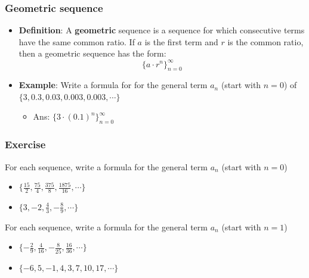 \documentclass[t]{beamer}
\theoremstyle{plain}
\theoremstyle{definition}
\begin{document}
\begin{frame}
\frametitle{Geometric sequence}
\begin{itemize}
	\item \textbf{Definition}: A \textbf{geometric} sequence is a sequence for which consecutive terms have the same common ratio.  If $a$ is the first term and $r$ is the common ratio, then a geometric sequence has the form:
	$$\{a \cdot r^{n}\}_{n=0}^{\infty}$$
	\item \textbf{Example}:  Write a formula for  for the general term $a_n$ (start with $n=0$) of $\{3, 0.3, 0.03, 0.003, 0.003, \cdots\}$
	\begin{itemize}
		\item Ans: $\{3 \cdot (0.1)^n\}_{n=0}^{\infty}$
	\end{itemize}
\end{itemize}

\end{frame}

\begin{frame}
\frametitle{Exercise}

For each sequence, write a formula for the general term $a_n$ (start with $n=0$)

\begin{itemize}
	\item $\{\frac{15}{2}, \frac{75}{4}, \frac{375}{8}, \frac{1875}{16}, \cdots\}$
	\item $\{3, -2, \frac{4}{3}, -\frac{8}{9}, \cdots\}$
\end{itemize}

For each sequence, write a formula for the general term $a_n$ (start with $n=1$)

\begin{itemize}
	\item $\{-\frac{2}{9}, \frac{4}{16}, -\frac{8}{25}, \frac{16}{36}, \cdots\}$
	\item $\{-6, 5, -1, 4, 3, 7, 10, 17, \cdots\}$
\end{itemize}

\end{frame}
\end{document}
